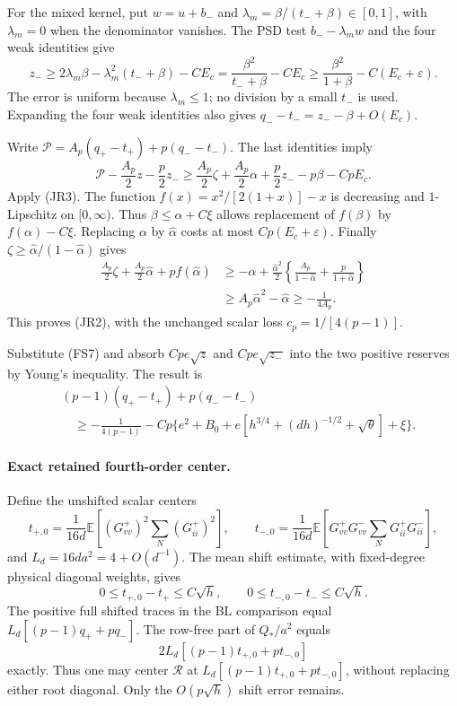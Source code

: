 \documentclass[10pt]{article}
\numberwithin{equation}{section}
\newcommand{\1}{\mathbf1}
\begin{document}
For the mixed kernel, put $w=u+b_-$ and
$\lambda_m=\beta/(t_-+\beta)\in[0,1]$, with $\lambda_m=0$ when the denominator
vanishes. The PSD test $b_--\lambda_m w$ and the four weak identities give
\[
 z_-\ge2\lambda_m\beta-\lambda_m^2(t_-+\beta)-CE_c
      =\frac{\beta^2}{t_-+\beta}-CE_c
      \ge\frac{\beta^2}{1+\beta}-C(E_c+\varepsilon).
 \tag{JR3}
\]
The error is uniform because $\lambda_m\le1$; no division by a small
$t_-$ is used. Expanding the four weak identities also gives
$q_--t_-=z_--\beta+O(E_c)$.

Write $\mathscr P=A_p(q_+-t_+)+p(q_--t_-)$. The last identities imply
\[
 \mathscr P-\frac{A_p}2z-\frac p2z_-
 \ge\frac{A_p}2\zeta+\frac{A_p}2\alpha+\frac p2z_--p\beta-CpE_c.
\]
Apply (JR3). The function
$f(x)=x^2/[2(1+x)]-x$ is decreasing and $1$-Lipschitz on
$[0,\infty)$. Thus $\beta\le\alpha+C\xi$ allows replacement of
$f(\beta)$ by $f(\alpha)-C\xi$. Replacing $\alpha$ by $\widehat\alpha$
costs at most $Cp(E_c+\varepsilon)$. Finally
$\zeta\ge\widehat\alpha/(1-\widehat\alpha)$ gives
\[
 \begin{split}
 \frac{A_p}2\zeta+\frac{A_p}2\widehat\alpha+p f(\widehat\alpha)
 &\ge-\widehat\alpha+\frac{\widehat\alpha^2}{2}
       \left\{\frac{A_p}{1-\widehat\alpha}+\frac p{1+\widehat\alpha}\right\}\\
 &\ge A_p\widehat\alpha^2-\widehat\alpha\ge-\frac1{4A_p}.
 \end{split}
\]
This proves (JR2), with the unchanged scalar loss
$c_p=1/[4(p-1)]$.

Substitute (FS7) and absorb $Cpe\sqrt z$ and $Cpe\sqrt{z_-}$
into the two positive reserves by Young's inequality. The result is
\[
 \begin{split}
 &(p-1)(q_+-t_+)+p(q_--t_-)\\
 &\quad\ge-\frac1{4(p-1)}
 -Cp\{e^2+B_0+e[h^{3/4}+(dh)^{-1/2}+\sqrt\theta]+\xi\}.
 \end{split}\tag{RC3}
\]

\paragraph{Exact retained fourth-order center.}
Define the unshifted scalar centers
\[
 t_{+,0}=\frac1{16d}\mathbb E[(G^+_{vv})^2\sum_N(G^+_{ii})^2],\qquad
 t_{-,0}=\frac1{16d}\mathbb E[G^+_{vv}G^-_{vv}
                                      \sum_NG^+_{ii}G^-_{ii}],
\]
and $L_d=16da^2=4+O(d^{-1})$.
The mean shift estimate, with fixed-degree physical diagonal weights,
gives
\[
 0\le t_{+,0}-t_+\le C\sqrt h,\qquad
 0\le t_{-,0}-t_-\le C\sqrt h.                         \tag{RC4}
\]
The positive full shifted traces in the BL comparison equal
$L_d[(p-1)q_++pq_-]$. The row-free part of $Q_*/a^2$ equals
\[
 2L_d[(p-1)t_{+,0}+pt_{-,0}]                            \tag{RC5}
\]
exactly. Thus one may center $\mathcal R$ at
$L_d[(p-1)t_{+,0}+pt_{-,0}]$, without replacing either root diagonal.
Only the $O(p\sqrt h)$ shift error remains.
\end{document}
